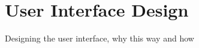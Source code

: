 \chapter{User Interface Design} %

\label{ch:uidesign} %
Designing the user interface, why this way and how